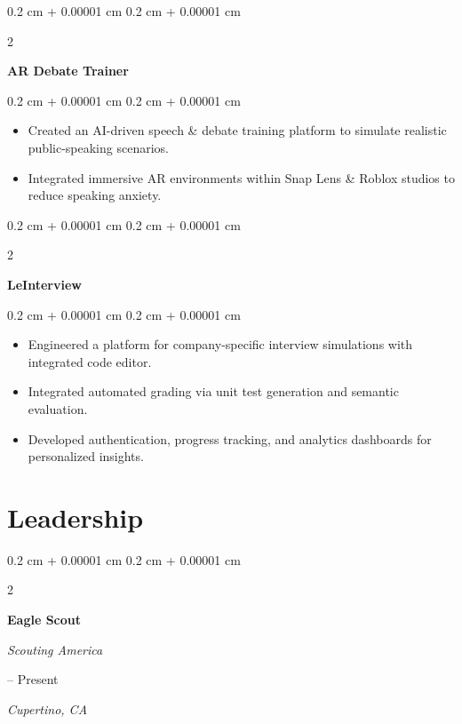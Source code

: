 \documentclass[10pt, letterpaper]{article}
\newenvironment{highlights}{
    \begin{itemize}[
        topsep=0.10 cm,
        parsep=0.10 cm,
        partopsep=0pt,
        itemsep=0pt,
        leftmargin=0.4 cm + 10pt
    ]
}{
    \end{itemize}
} %
\newenvironment{onecolentry}{
    \begin{adjustwidth}{
        0.2 cm + 0.00001 cm
    }{
        0.2 cm + 0.00001 cm
    }
}{
    \end{adjustwidth}
} %
\newenvironment{twocolentry}[2][]{
    \onecolentry
    \def\secondColumn{#2}
    \setcolumnwidth{\fill, 6.5 cm}
    \begin{paracol}{2}
}{
    \switchcolumn \raggedleft \secondColumn
    \end{paracol}
    \endonecolentry
} %
\let\hrefWithoutArrow\href
\renewcommand{\href}[2]{\hrefWithoutArrow{#1}{\ifthenelse{\equal{#2}{}}{ }{#2 }\raisebox{.15ex}{\footnotesize \faExternalLink*}}}
\begin{document}
        \vspace{0.2 cm}

        \begin{twocolentry}{}
            \textbf{AR Debate Trainer
            \href{https://github.com/rob-9/punchline}{}}
        \end{twocolentry}

        \vspace{0.10 cm}
        \begin{onecolentry}
            \begin{highlights}
                \item Created an AI-driven speech \& debate training platform to simulate realistic public-speaking scenarios.
                \item Integrated immersive AR environments within Snap Lens \& Roblox studios to reduce speaking anxiety.
            \end{highlights}
        \end{onecolentry}


        \vspace{0.2 cm}

        \begin{twocolentry}{}
            \textbf{LeInterview
            \href{https://github.com/rob-9/LeInterview}{}}
        \end{twocolentry}

        \vspace{0.10 cm}
        \begin{onecolentry}
            \begin{highlights}
                \item Engineered a platform for company-specific interview simulations with integrated code editor.
                \item Integrated automated grading via unit test generation and semantic evaluation.
                \item Developed authentication, progress tracking, and analytics dashboards for personalized insights.
            \end{highlights}
        \end{onecolentry}


    \section{Leadership}

        \begin{twocolentry}{
        2012 -- Present    
            
        \textit{Cupertino, CA}}
            \textbf{Eagle Scout}
            
            \textit{Scouting America}
        \end{twocolentry}
\end{document}
